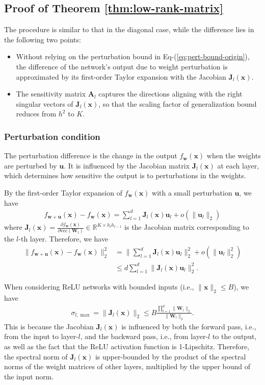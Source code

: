 \documentclass[journal]{IEEEtran} %
\def\eqref#1{Eq-(\ref{#1})}
\def\vu{{\bm{u}}}
\def\vw{{\bm{w}}}
\def\vx{{\bm{x}}}
\def\mA{{\bm{A}}}
\def\mJ{{\bm{J}}}
\def\mW{{\bm{W}}}
\newcommand{\R}{\mathbb{R}}
\newcommand{\Norm}[1]{\|#1\|}
\begin{document}
\subsection{Proof of Theorem \ref{thm:low-rank-matrix}}
\label{proof:low-rank-matrix}
The procedure is similar to that in the diagonal case, while the difference lies in the following two points:
\begin{itemize}
    \item Without relying on the perturbation bound in \eqref{eq:pert-bound-origin}, the difference of the network's output due to weight perturbation is approximated by its first-order Taylor expansion with the Jacobian $\mJ_l(\vx)$.
    \item The sensitivity matrix $\mA_l$ captures the directions aligning with the right singular vectors of $\mJ_l(\vx)$, so that the scaling factor of generalization bound reduces from $h^2$ to $K$.
\end{itemize}
\subsubsection{Perturbation condition}
The perturbation difference is the change in the output $f_{\vw}(\vx)$ when the weights are perturbed by $\vu$. It is influenced by the Jacobian matrix $\mJ_l(\vx)$ at each layer, which determines how sensitive the output is to perturbations in the weights.

By the first-order Taylor expansion of $f_{\vw}(\vx)$ with a small perturbation $\vu$, we have
\begin{align}
    f_{\vw+\vu}(\vx) - f_{\vw}(\vx) = \sum_{l=1}^d \mJ_l(\vx) \vu_l  + o(\Norm{\vu_l}_2)
\end{align}
where $\mJ_l(\vx)=\frac{\partial f_{\vw}(\vx)}{\partial \mathrm{vec}(\mW_l)} \in \R^{K \times h_lh_{l-1}} $ is the Jacobian matrix corresponding to the $l$-th layer.
Therefore, we have
\begin{align}
    \Norm{f_{\vw+\vu}(\vx) - f_{\vw}(\vx)}_2^2 &= \Norm{\sum_{l=1}^d \mJ_l(\vx) \vu_l}_2^2 + o(\Norm{\vu_l}_2^2)\\
    &\le d \sum_{l=1}^d \Norm{\mJ_l(\vx) \vu_l}_2^2.
\end{align}

When considering ReLU networks with bounded inputs (i.e., $\Norm{\vx}_2 \le B$), we have
\begin{align}
    \sigma_{l,\max} = \Norm{\mJ_l(\vx)}_2 \le B\frac{\prod_{l=1}^d \Norm{\mW_l}_2}{\Norm{\mW_l}_2}.
\end{align}
This is because the Jacobian $\mJ_l(\vx)$ is influenced by both the forward pass, i.e., from the input to layer-$l$, and the backward pass, i.e., from layer-$l$ to the output, as well as the fact that the ReLU activation function is 1-Lipschitz. Therefore, the spectral norm of $\mJ_l(\vx)$ is upper-bounded by the product of the spectral norms of the weight matrices of other layers, multiplied by the upper bound of the input norm.
\end{document}
